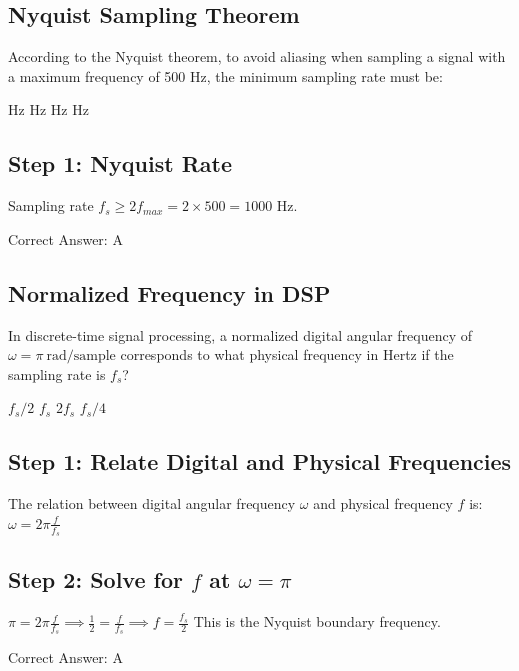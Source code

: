 \subsection{Nyquist Sampling Theorem}

According to the Nyquist theorem, to avoid aliasing when sampling a signal with a maximum frequency of 500 Hz, the minimum sampling rate must be:

\begin{choices}
     Hz
     Hz
     Hz
     Hz
\end{choices}

\begin{solution}

\subsection*{Step 1: Nyquist Rate}
Sampling rate $f_s \geq 2 f_{max} = 2 \times 500 = 1000$ Hz.

Correct Answer: A
\end{solution}

\clearpage

\subsection{Normalized Frequency in DSP}

In discrete-time signal processing, a normalized digital angular frequency of $\omega = \pi\ \text{rad/sample}$ corresponds to what physical frequency in Hertz if the sampling rate is $f_s$?

\begin{choices}
    \correctchoice $f_s / 2$
    \choice $f_s$
    \choice $2 f_s$
    \choice $f_s / 4$
\end{choices}

\begin{solution}

\subsection*{Step 1: Relate Digital and Physical Frequencies}
The relation between digital angular frequency $\omega$ and physical frequency $f$ is:
$\omega = 2\pi \frac{f}{f_s}$

\subsection*{Step 2: Solve for $f$ at $\omega = \pi$}
$\pi = 2\pi \frac{f}{f_s} \implies \frac{1}{2} = \frac{f}{f_s} \implies f = \frac{f_s}{2}$
This is the Nyquist boundary frequency.

Correct Answer: A
\end{solution}

